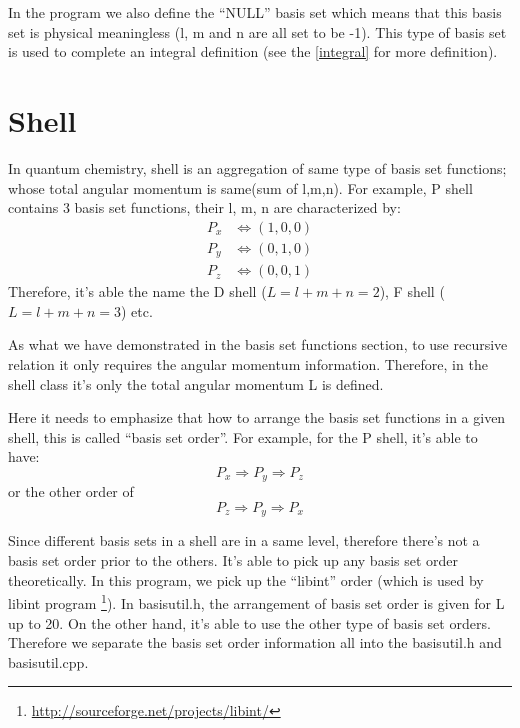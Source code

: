 In the program we also define the ``NULL'' basis set which means that 
this basis set is physical meaningless (l, m and n are all set to be -1). 
This type of basis set is used to complete an integral definition (see the \ref{integral} 
for more definition).

\section{Shell}
%
%
%
\label{shell}

In quantum chemistry, shell is an aggregation of same type of basis set
functions; whose total angular momentum is same(sum of l,m,n). For example, 
P shell contains 3 basis set functions, their l, m, n are characterized by:
\begin{align}
	P_{x} &\Leftrightarrow (1,0,0) \nonumber \\
	P_{y} &\Leftrightarrow (0,1,0) \nonumber \\
	P_{z} &\Leftrightarrow (0,0,1)
\end{align}
Therefore, it's able the name the D shell ($L = l+m+n = 2$), 
F shell ($L = l+m+n = 3$) etc.

As what we have demonstrated in the basis set functions section, to use
recursive relation it only requires the angular momentum information. 
Therefore, in the shell class it's only the total angular momentum L
is defined.

Here it needs to emphasize that how to arrange the basis set
functions in a given shell, this is called ``basis set order''.
For example, for the P shell, it's able to have:
\begin{equation}
 P_{x} \Rightarrow P_{y} \Rightarrow P_{z}
\end{equation} 
or the other order of 
\begin{equation}
 P_{z} \Rightarrow P_{y} \Rightarrow P_{x}
\end{equation} 

Since different basis sets in a shell are in a same level, therefore
there's not a basis set order prior to the others. It's able to 
pick up any basis set order theoretically. In this program, we 
pick up the ``libint'' order (which is used by libint program
\footnote{\url{http://sourceforge.net/projects/libint/}}). 
In basisutil.h, the arrangement of basis set order is given for 
L up to 20. On the other hand, it's able to use the other 
type of basis set orders. Therefore we separate the basis set 
order information all into the basisutil.h and basisutil.cpp.

